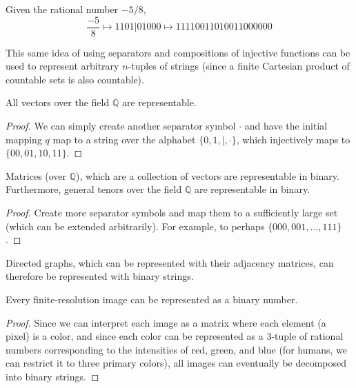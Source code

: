 \documentclass{article}
\begin{document}
  \begin{example}
  Given the rational number $-5/8$,
  \[\frac{-5}{8} \mapsto 1101|01000 \mapsto 11110011010011000000\]
  \end{example}

  This same idea of using separators and compositions of injective functions can be used to represent arbitrary $n$-tuples of strings (since a finite Cartesian product of countable sets is also countable). 

  \begin{theorem}
  All vectors over the field $\mathbb{Q}$ are representable. 
  \end{theorem}
  \begin{proof}
  We can simply create another separator symbol $\cdot$ and have the initial mapping $q$ map to a string over the alphabet $\{0, 1, |, \cdot\}$, which injectively maps to $\{00, 01, 10, 11\}$. 
  \end{proof}

  \begin{corollary}
  Matrices (over $\mathbb{Q}$), which are a collection of vectors are representable in binary. Furthermore, general tenors over the field $\mathbb{Q}$ are representable in binary. 
  \end{corollary}
  \begin{proof}
  Create more separator symbols and map them to a sufficiently large set (which can be extended arbitrarily). For example, to perhaps $\{000, 001, ..., 111\}$. 
  \end{proof}

  \begin{corollary}
  Directed graphs, which can be represented with their adjacency matrices, can therefore be represented with binary strings. 
  \end{corollary}

  \begin{theorem}
  Every finite-resolution image can be represented as a binary number. 
  \end{theorem}
  \begin{proof}
  Since we can interpret each image as a matrix where each element (a pixel) is a color, and since each color can be represented as a 3-tuple of rational numbers corresponding to the intensities of red, green, and blue (for humans, we can restrict it to three primary colors), all images can eventually be decomposed into binary strings. 
  \end{proof}
\end{document}
